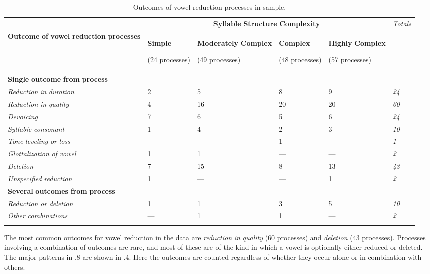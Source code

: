 \begin{table}
\begin{tabularx}{\textwidth}{XXXXXX}
\lsptoprule
 & \multicolumn{4}{c}{ \textbf{Syllable} \textbf{Structure} \textbf{Complexity}} & \textit{Totals}\\
 \textbf{Outcome} \textbf{of} \textbf{vowel} \textbf{reduction} \textbf{processes} & { \textbf{Simple}}

 (24 processes) & { \textbf{Moderately} \textbf{Complex}}

 (49 processes) & { \textbf{Complex}}

 (48 processes) & { \textbf{Highly} \textbf{Complex}}

 (57 processes) & \\
 \textbf{Single} \textbf{outcome} \textbf{from} \textbf{process} & \multicolumn{5}{c}{}\\
 \textit{Reduction} \textit{in} \textit{duration} & 2 & 5 & 8 & 9 & \textit{24}\\
 \textit{Reduction} \textit{in} \textit{quality} & 4 & 16 & 20 & 20 & \textit{60}\\
 \textit{Devoicing} & 7 & 6 & 5 & 6 & \textit{24}\\
 \textit{Syllabic} \textit{consonant} & 1 & 4 & 2 & 3 & \textit{10}\\
 \textit{Tone} \textit{leveling} \textit{or} \textit{loss} & — & — & 1 & — & \textit{1}\\
 \textit{Glottalization} \textit{of} \textit{vowel} & 1 & 1 & — & — & \textit{2}\\
 \textit{Deletion} & 7 & 15 & 8 & 13 & \textit{43}\\
 \textit{Unspecified} \textit{reduction} & 1 & — & — & 1 & \textit{2}\\
 \textbf{Several} \textbf{outcomes} \textbf{from} \textbf{process} & \multicolumn{5}{c}{}\\
 \textit{Reduction} \textit{or} \textit{deletion} & 1 & 1 & 3 & 5 & \textit{10}\\
 \textit{Other} \textit{combinations} & — & 1 & 1 & — & \textit{2}\\
\lspbottomrule
\end{tabularx}
\caption{\label{6.8}Outcomes of vowel reduction processes in sample.}
\end{table}

  The most common outcomes for vowel reduction in the data are \textit{reduction} \textit{in} \textit{quality} (60 processes) and \textit{deletion} (43 processes). Processes involving a combination of outcomes are rare, and most of these are of the kind in which a vowel is optionally either reduced or deleted. The major patterns in .8 are shown in .4. Here the outcomes are counted regardless of whether they occur alone or in combination with others.


